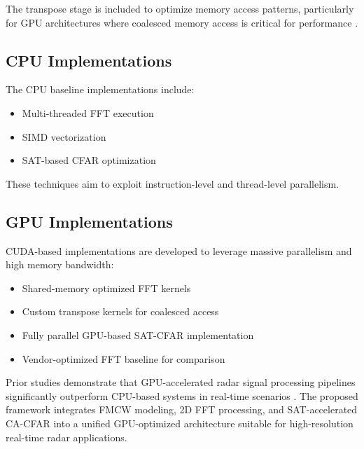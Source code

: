 \documentclass[conference, a4paper]{IEEEtran}
\begin{document}
The transpose stage is included to optimize memory access patterns, particularly for GPU architectures where coalesced memory access is critical for performance \cite{liu2023,zhao2023}.

\subsection{CPU Implementations}

The CPU baseline implementations include:

\begin{itemize}
    \item Multi-threaded FFT execution
    \item SIMD vectorization
    \item SAT-based CFAR optimization
\end{itemize}

These techniques aim to exploit instruction-level and thread-level parallelism.

\subsection{GPU Implementations}

CUDA-based implementations are developed to leverage massive parallelism and high memory bandwidth:

\begin{itemize}
    \item Shared-memory optimized FFT kernels
    \item Custom transpose kernels for coalesced access
    \item Fully parallel GPU-based SAT-CFAR implementation
    \item Vendor-optimized FFT baseline for comparison
\end{itemize}

Prior studies demonstrate that GPU-accelerated radar signal processing pipelines significantly outperform CPU-based systems in real-time scenarios \cite{jung2023,zhao2023,liu2023}. The proposed framework integrates FMCW modeling, 2D FFT processing, and SAT-accelerated CA-CFAR into a unified GPU-optimized architecture suitable for high-resolution real-time radar applications.
\end{document}
